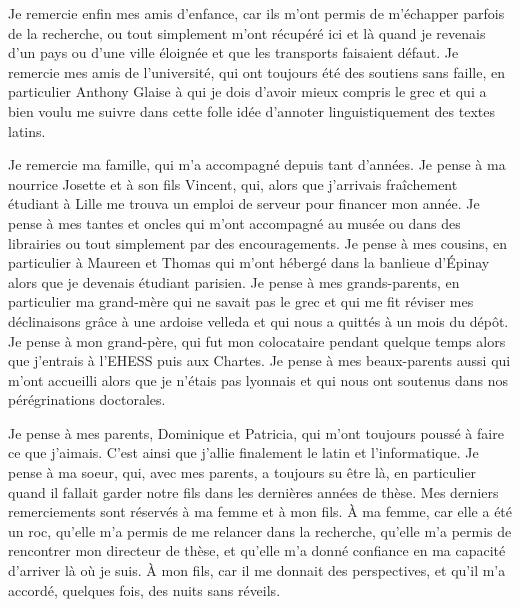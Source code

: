 Je remercie enfin mes amis d'enfance, car ils m'ont permis de m'échapper parfois de la recherche, ou tout simplement m'ont récupéré ici et là quand je revenais d'un pays ou d'une ville éloignée et que les transports faisaient défaut. Je remercie mes amis de l'université, qui ont toujours été des soutiens sans faille, en particulier Anthony Glaise à qui je dois d'avoir mieux compris le grec et qui a bien voulu me suivre dans cette folle idée d'annoter linguistiquement des textes latins.

Je remercie ma famille, qui m'a accompagné depuis tant d'années. Je pense à ma nourrice Josette et à son fils Vincent, qui, alors que j'arrivais fraîchement étudiant à Lille me trouva un emploi de serveur pour financer mon année. Je pense à mes tantes et oncles qui m'ont accompagné au musée ou dans des librairies ou tout simplement par des encouragements. Je pense à mes cousins, en particulier à Maureen et Thomas qui m'ont hébergé dans la banlieue d'Épinay alors que je devenais étudiant parisien. Je pense à mes grands-parents, en particulier ma grand-mère qui ne savait pas le grec et qui me fit réviser mes déclinaisons grâce à une ardoise velleda et qui nous a quittés à un mois du dépôt. Je pense à mon grand-père, qui fut mon colocataire pendant quelque temps alors que j'entrais à l'EHESS puis aux Chartes. Je pense à mes beaux-parents aussi qui m'ont accueilli alors que je n'étais pas lyonnais et qui nous ont soutenus dans nos pérégrinations doctorales.

Je pense à mes parents, Dominique et Patricia, qui m'ont toujours poussé à faire ce que j'aimais. C'est ainsi que j'allie finalement le latin et l'informatique. Je pense à ma soeur, qui, avec mes parents, a toujours su être là, en particulier quand il fallait garder notre fils dans les dernières années de thèse. Mes derniers remerciements sont réservés à ma femme et à mon fils. À ma femme, car elle a été un roc, qu'elle m'a permis de me relancer dans la recherche, qu'elle m'a permis de rencontrer mon directeur de thèse, et qu'elle m'a donné confiance en ma capacité d'arriver là où je suis. À mon fils, car il me donnait des perspectives, et qu'il m'a accordé, quelques fois, des nuits sans réveils.